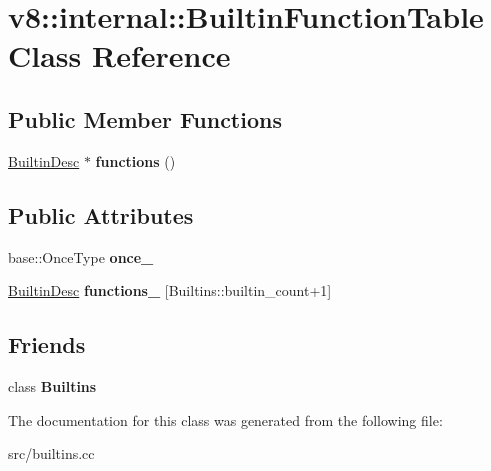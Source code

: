 \hypertarget{classv8_1_1internal_1_1_builtin_function_table}{}\section{v8\+:\+:internal\+:\+:Builtin\+Function\+Table Class Reference}
\label{classv8_1_1internal_1_1_builtin_function_table}
\subsection*{Public Member Functions}
\begin{DoxyCompactItemize}
\item 
\hypertarget{classv8_1_1internal_1_1_builtin_function_table_a10ec52c395d6924f6474b076298106b4}{}\hyperlink{structv8_1_1internal_1_1_builtin_desc}{Builtin\+Desc} $\ast$ {\bfseries functions} ()\label{classv8_1_1internal_1_1_builtin_function_table_a10ec52c395d6924f6474b076298106b4}

\end{DoxyCompactItemize}
\subsection*{Public Attributes}
\begin{DoxyCompactItemize}
\item 
\hypertarget{classv8_1_1internal_1_1_builtin_function_table_a1a9fe672f4e4d2e9ad88f62c63d8d461}{}base\+::\+Once\+Type {\bfseries once\+\_\+}\label{classv8_1_1internal_1_1_builtin_function_table_a1a9fe672f4e4d2e9ad88f62c63d8d461}

\item 
\hypertarget{classv8_1_1internal_1_1_builtin_function_table_a362e4df9c4683bf2e2575590d29f7bb8}{}\hyperlink{structv8_1_1internal_1_1_builtin_desc}{Builtin\+Desc} {\bfseries functions\+\_\+} \mbox{[}Builtins\+::builtin\+\_\+count+1\mbox{]}\label{classv8_1_1internal_1_1_builtin_function_table_a362e4df9c4683bf2e2575590d29f7bb8}

\end{DoxyCompactItemize}
\subsection*{Friends}
\begin{DoxyCompactItemize}
\item 
\hypertarget{classv8_1_1internal_1_1_builtin_function_table_afb9273054bbf7171a46b35cebb4d4b34}{}class {\bfseries Builtins}\label{classv8_1_1internal_1_1_builtin_function_table_afb9273054bbf7171a46b35cebb4d4b34}

\end{DoxyCompactItemize}


The documentation for this class was generated from the following file\+:\begin{DoxyCompactItemize}
\item 
src/builtins.\+cc\end{DoxyCompactItemize}
